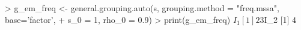 \begin{CodeChunk}
\begin{CodeInput}


> g_em_freq <- general.grouping.auto(s, grouping.method = "freq.mssa", base='factor',
+                                  s_0 = 1, rho_0 = 0.9)
> print(g_em_freq)
$I_1
[1] 2 3
$I_2
[1] 4
\end{CodeInput}

\end{CodeChunk}